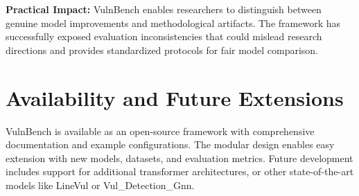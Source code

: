 \documentclass[letterpaper]{article}
\begin{document}
\textbf{Practical Impact:} VulnBench enables researchers to distinguish between genuine model improvements and methodological artifacts. The framework has successfully exposed evaluation inconsistencies that could mislead research directions and provides standardized protocols for fair model comparison.

\section{Availability and Future Extensions}

VulnBench is available as an open-source framework with comprehensive documentation and example configurations. The modular design enables easy extension with new models, datasets, and evaluation metrics. Future development includes support for additional transformer architectures, or other state-of-the-art models like LineVul or Vul\_Detection\_Gnn.



\end{document}
